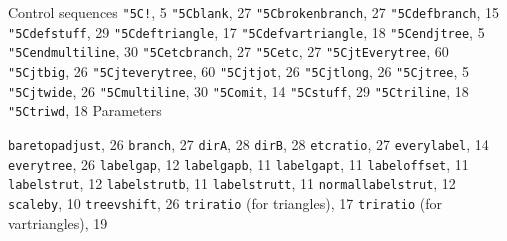 \def\\{\char"5C}
Control sequences\smallskip
{\tt \\!}, 5
{\tt \\blank}, 27
{\tt \\brokenbranch}, 27
{\tt \\defbranch}, 15
{\tt \\defstuff}, 29
{\tt \\deftriangle}, 17
{\tt \\defvartriangle}, 18
{\tt \\endjtree}, 5
{\tt \\endmultiline}, 30
{\tt \\etcbranch}, 27
{\tt \\etc}, 27
{\tt \\jtEverytree}, 60
{\tt \\jtbig}, 26
{\tt \\jteverytree}, 60
{\tt \\jtjot}, 26
{\tt \\jtlong}, 26
{\tt \\jtree}, 5
{\tt \\jtwide}, 26
{\tt \\multiline}, 30
{\tt \\omit}, 14
{\tt \\stuff}, 29
{\tt \\triline}, 18
{\tt \\triwd}, 18
\medskip Parameters\smallskip

{\tt baretopadjust}, 26
{\tt branch}, 27
{\tt dirA}, 28
{\tt dirB}, 28
{\tt etcratio}, 27
{\tt everylabel}, 14
{\tt everytree}, 26
{\tt labelgap}, 12
{\tt labelgapb}, 11
{\tt labelgapt}, 11
{\tt labeloffset}, 11
{\tt labelstrut}, 12
{\tt labelstrutb}, 11
{\tt labelstrutt}, 11
{\tt normallabelstrut}, 12
{\tt scaleby}, 10
{\tt treevshift}, 26
{\tt triratio} (for triangles), 17
{\tt triratio} (for vartriangles), 19
